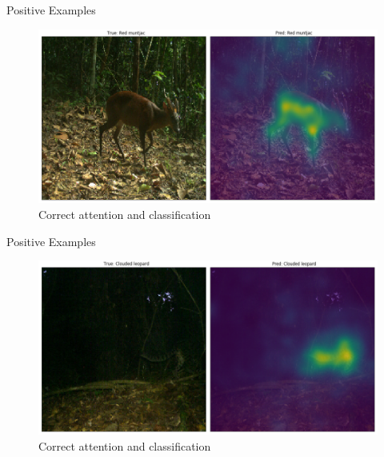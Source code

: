 \documentclass[10pt]{beamer}
\begin{document}

\begin{frame}{Positive Examples}
	\centering
	\begin{figure}
		\includegraphics[width=\columnwidth]{images/Attention_right6.png}
		\caption{Correct attention and classification}
	\end{figure}
\end{frame}


\begin{frame}{Positive Examples}
	\centering
	\begin{figure}
		\includegraphics[width=\columnwidth]{images/Attention_right5.png}
		\caption{Correct attention and classification}
	\end{figure}
\end{frame}

\end{document}
